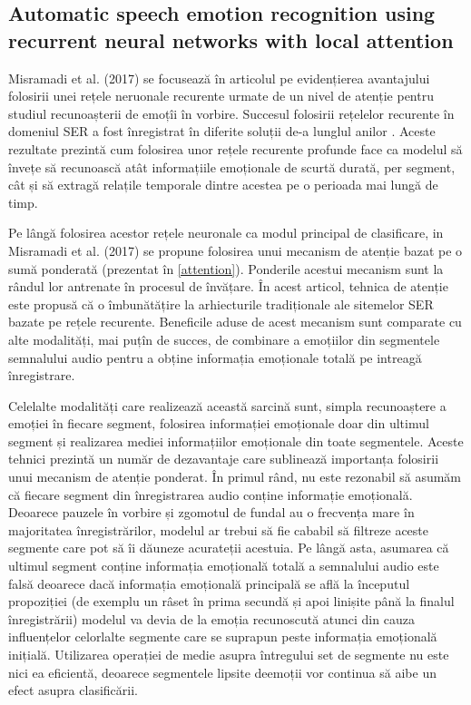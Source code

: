 \documentclass[a4paper,12pt]{book}
\begin{document}
					\subsection{Automatic speech emotion recognition using recurrent neural networks with local attention}
					 \label{prez_misramadi}
					 Misramadi et al. (2017) se focusează în articolul \cite{misramadi} pe evidențierea avantajului folosirii unei rețele neruonale recurente urmate de un nivel de atenție pentru studiul recunoașterii de emoțîi în vorbire. Succesul folosirii rețelelor recurente în domeniul SER a fost înregistrat în diferite soluții de-a lunglul anilor \cite{yuan,multi-domain,rnn1,rnn2}. Aceste rezultate prezintă cum folosirea unor rețele recurente profunde face ca modelul să învețe să recunoască atât informațiile emoționale de scurtă durată, per segment, cât și să extragă relațile temporale dintre acestea pe o perioada mai lungă de timp. \par
					 
					 \par 
					 Pe lângă folosirea acestor rețele neuronale ca modul principal de clasificare, in Misramadi et al. (2017) se propune folosirea unui mecanism de atenție bazat pe o sumă ponderată (prezentat în \ref{attention}). Ponderile acestui mecanism sunt la rândul lor antrenate în procesul de învățare. În acest articol, tehnica de atenție este propusă că o îmbunătățire la arhiecturile tradiționale ale sitemelor SER bazate pe rețele recurente. Beneficile aduse de acest mecanism sunt comparate cu alte modalități, mai puțîn de succes, de combinare a emoțiilor din segmentele semnalului audio pentru a obține informația emoționale totală pe intreagă înregistrare. \par
					 
					 Celelalte modalități care realizează această sarcină sunt, simpla recunoaștere a emoției în fiecare segment, folosirea informației emoționale doar din ultimul segment și realizarea mediei informațiilor emoționale din toate segmentele. Aceste tehnici prezintă un număr de dezavantaje care sublinează importanța folosirii unui mecanism de atenție ponderat. În primul rând, nu este rezonabil să asumăm că fiecare segment din înregistrarea audio conține informație emoțională. Deoarece pauzele în vorbire și zgomotul de fundal au o frecvența mare în majoritatea înregistrărilor, modelul ar trebui să fie cababil să filtreze aceste segmente care pot să îi dăuneze acurateții acestuia. Pe lângă asta, asumarea că ultimul segment conține informația emoțională totală a semnalului audio este falsă deoarece dacă informația emoțională principală se află la începutul propoziției (de exemplu un râset în prima secundă și apoi linișite până la finalul înregistrării) modelul va devia de la emoția recunoscută atunci din cauza influențelor celorlalte segmente care se suprapun peste informația emoțională inițială. Utilizarea operației de medie asupra întregului set de segmente nu este nici ea eficientă, deoarece segmentele lipsite deemoții vor continua să aibe un efect asupra clasificării. \par
					 
\end{document}

